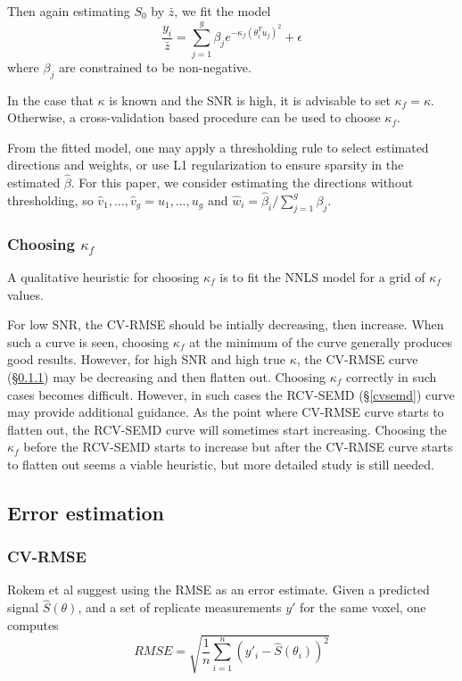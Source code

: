 \documentclass[11pt]{article}
\begin{document}
Then again estimating $S_0$ by $\bar{z}$, we fit the model
\[
\frac{y_i}{\bar{z}} =\sum_{j=1}^g \beta_j e^{-\kappa_f  (\theta_i^T u_j)^2} +\epsilon
\]
where $\beta_j$ are constrained to be non-negative.

In the case that $\kappa$ is known and the SNR is high, it is
advisable to set $\kappa_f = \kappa$.
Otherwise, a cross-validation based procedure can be used to choose
$\kappa_f$.

From the fitted model, one may apply a thresholding rule to select
estimated directions and weights, or use L1 regularization to ensure
sparsity in the estimated $\hat{\beta}$.
For this paper, we consider estimating the directions without
thresholding, so
$\hat{v}_1,\hdots,\hat{v}_g = u_1,\hdots,u_g$ and $\hat{w}_i =
\hat{\beta}_i/\sum_{j=1}^g \beta_j$.

\subsubsection{Choosing $\kappa_f$}

A qualitative heuristic for choosing $\kappa_f$ is to fit the NNLS
model for a grid of $\kappa_f$ values.

For low SNR, the CV-RMSE should be intially decreasing, then increase.
When such a curve is seen, choosing $\kappa_f$ at the minimum of the
curve generally produces good results.
However, for high SNR and high true $\kappa$, the CV-RMSE curve (\S\ref{cvrmse}) may be
decreasing and then flatten out.
Choosing $\kappa_f$ correctly in such cases becomes difficult.
However, in such cases the RCV-SEMD (\S\ref{cvsemd}) curve may provide
additional guidance.
As the point where CV-RMSE curve starts to flatten out,
the RCV-SEMD curve will sometimes start increasing.
Choosing the $\kappa_f$ before the RCV-SEMD starts to increase but
after the CV-RMSE curve starts to flatten out seems a viable
heuristic,
but more detailed study is still needed.

\subsection{Error estimation}

\subsubsection{CV-RMSE}\label{cvrmse}

Rokem et al \cite{Rokem2013} suggest using the RMSE as an error estimate.
Given a predicted signal $\hat{S}(\theta)$,
and a set of replicate measurements $y'$ for the same voxel,
one computes
\[
RMSE = \sqrt{\frac{1}{n}\sum_{i=1}^n (y'_i - \hat{S}(\theta_i))^2}
\]
\end{document}
